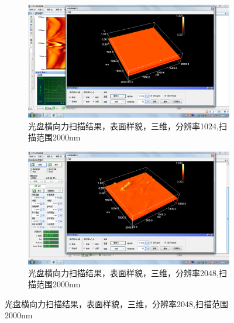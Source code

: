 \documentclass{ctexart}
\begin{document}
\begin{figure}[H]
  \centering
  \begin{subfigure}{.49\textwidth}
    \centering
    \includegraphics[width=\linewidth]{AFM结果图像/光盘横向力三维_1024_2000nm}
    \caption{光盘横向力扫描结果，表面样貌，三维，分辨率1024,扫描范围2000nm}
  \end{subfigure}
  \begin{subfigure}{.49\textwidth}
    \centering
    \includegraphics[width=\linewidth]{AFM结果图像/光盘横向力三维_2048_2000nm}
    \caption{光盘横向力扫描结果，表面样貌，三维，分辨率2048,扫描范围2000nm}
  \end{subfigure}
\end{figure}
\end{document}
